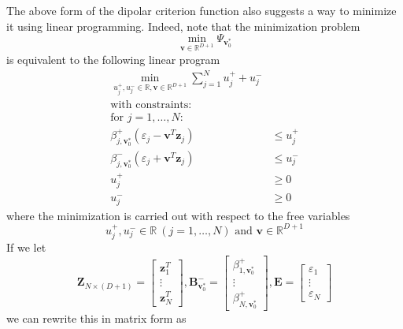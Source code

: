 \documentclass[12pt]{amsart}
\theoremstyle{definition}
\theoremstyle{plain}
\theoremstyle{remark}
\newcommand{\RR}{\mathbb{R}}
\newcommand{\eps}{\varepsilon}
\begin{document}
The above form of the dipolar criterion function also suggests a way to minimize it using linear programming. Indeed, note that the minimization problem
$$
\min_{\mathbf{v} \in \RR^{D + 1}} \Psi_{\mathbf{v}_0^\ast}
$$ is equivalent to the following linear program
\begin{align*}
\min_{u_j^+, u_j^- \in \RR, \mathbf{v} \in \RR^{D + 1}} \sum_{j = 1}^N u_j^+ + u_j^- \\
\text{with constraints:} \\
\text{for } j = 1, \ldots, N: \\
\beta^+_{j, \mathbf{v}_0^\ast} (\eps_j - \mathbf{v}^T \mathbf{z}_j) &\leq u_j^+ \\
\beta^-_{j, \mathbf{v}_0^\ast} (\eps_j + \mathbf{v}^T \mathbf{z}_j) &\leq u_j^- \\
u_j^+ &\geq 0 \\
u_j^- &\geq 0
\end{align*} where the minimization is carried out with respect to the free variables 
$$
u_j^+, u_j^- \in \RR\ (j = 1, \ldots, N) \text{ and } \mathbf{v} \in \RR^{D + 1}
$$ If we let
$$
\mathbf{Z}_{N \times (D + 1)} = \begin{bmatrix} \mathbf{z}_1^T \\ \vdots \\ \mathbf{z}_N^T \end{bmatrix}, \mathbf{B}^-_{\mathbf{v}_0^\ast} = \begin{bmatrix} \beta^+_{1, \mathbf{v}_0^\ast} \\ \vdots \\ \beta^+_{N, \mathbf{v}_0^\ast} \end{bmatrix}, \mathbf{E} = \begin{bmatrix} \eps_1 \\ \vdots \\ \eps_N \end{bmatrix}
$$ we can rewrite this in matrix form as
\end{document}

